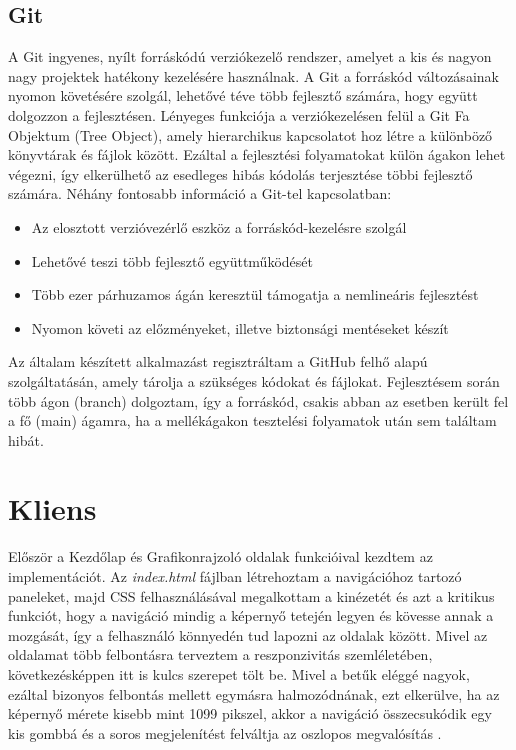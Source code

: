 \subsection{Git }

A Git ingyenes, nyílt forráskódú verziókezelő rendszer, amelyet a kis és nagyon nagy projektek hatékony kezelésére használnak. A Git a forráskód változásainak nyomon követésére szolgál, lehetővé téve több fejlesztő számára, hogy együtt dolgozzon a fejlesztésen. Lényeges funkciója a verziókezelésen felül a Git Fa Objektum (Tree Object), amely hierarchikus kapcsolatot hoz létre a különböző könyvtárak és fájlok között. Ezáltal a fejlesztési folyamatokat külön ágakon lehet végezni, így elkerülhető az esedleges hibás kódolás terjesztése többi fejlesztő számára. Néhány fontosabb információ a Git-tel kapcsolatban: 

\begin{itemize}
\item Az elosztott verzióvezérlő eszköz a forráskód-kezelésre szolgál
\item Lehetővé teszi több fejlesztő együttműködését
\item Több ezer párhuzamos ágán keresztül támogatja a nemlineáris fejlesztést
\item Nyomon követi az előzményeket, illetve biztonsági mentéseket készít \cite{git}
\end{itemize}

Az általam készített alkalmazást regisztráltam a GitHub felhő alapú szolgáltatásán, amely tárolja a szükséges kódokat és fájlokat. Fejlesztésem során több ágon (branch) dolgoztam, így a forráskód, csakis abban az esetben került fel a fő (main) ágamra, ha a mellékágakon tesztelési folyamatok után sem találtam hibát.

\section{Kliens}

Először a Kezdőlap és Grafikonrajzoló oldalak funkcióival kezdtem az implementációt. Az \emph{index.html} fájlban létrehoztam a navigációhoz tartozó paneleket, majd CSS felhasználásával megalkottam a kinézetét és azt a kritikus funkciót, hogy a navigáció mindig a képernyő tetején legyen és kövesse annak a mozgását, így a felhasználó könnyedén tud lapozni az oldalak között. Mivel az oldalamat több felbontásra terveztem a reszponzivitás szemléletében, következésképpen itt is kulcs szerepet tölt be. Mivel a betűk eléggé nagyok, ezáltal bizonyos felbontás mellett egymásra halmozódnának, ezt elkerülve, ha az képernyő mérete kisebb mint 1099 pikszel, akkor a navigáció összecsukódik egy kis gombbá és a soros megjelenítést felváltja az oszlopos megvalósítás .

